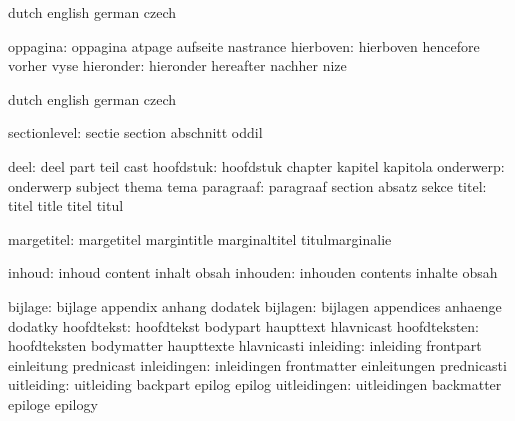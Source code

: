 \stopvariables


\startvariables  dutch       english     german     czech

      oppagina:  oppagina    atpage      aufseite   nastrance
     hierboven:  hierboven   hencefore   vorher     vyse
     hieronder:  hieronder   hereafter   nachher    nize

\stopvariables





\startvariables       dutch                english             german
                      czech

       sectionlevel:  sectie               section             abschnitt
                      oddil

               deel:  deel                 part                teil
                      cast
          hoofdstuk:  hoofdstuk            chapter             kapitel
                      kapitola
          onderwerp:  onderwerp            subject             thema
                      tema
          paragraaf:  paragraaf            section             absatz
                      sekce
              titel:  titel                title               titel
                      titul

         margetitel:  margetitel           margintitle         marginaltitel
                      titulmarginalie
 
             inhoud:  inhoud               content             inhalt
                      obsah
           inhouden:  inhouden             contents            inhalte
                      obsah

            bijlage:  bijlage              appendix            anhang
                      dodatek
           bijlagen:  bijlagen             appendices          anhaenge
                      dodatky
         hoofdtekst:  hoofdtekst           bodypart            haupttext
                      hlavnicast
       hoofdteksten:  hoofdteksten         bodymatter          haupttexte
                      hlavnicasti
          inleiding:  inleiding            frontpart           einleitung
                      prednicast
        inleidingen:  inleidingen          frontmatter         einleitungen
                      prednicasti
         uitleiding:  uitleiding           backpart            epilog
                      epilog
       uitleidingen:  uitleidingen         backmatter          epiloge
                      epilogy

